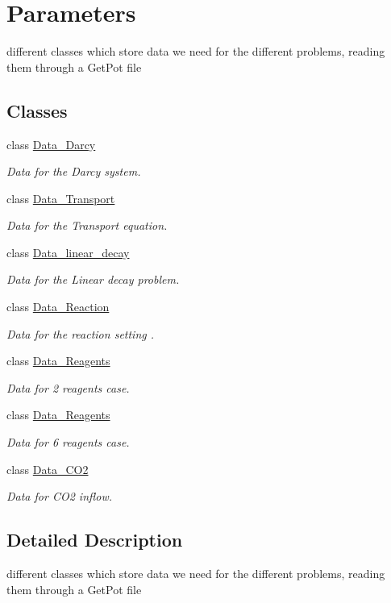 \hypertarget{group__Parameters}{}\section{Parameters}
\label{group__Parameters}


different classes which store data we need for the different problems, reading them through a Get\+Pot file  


\subsection*{Classes}
\begin{DoxyCompactItemize}
\item 
class \hyperlink{classData__Darcy}{Data\+\_\+\+Darcy}
\begin{DoxyCompactList}\small\item\em Data for the Darcy system. \end{DoxyCompactList}\item 
class \hyperlink{classData__Transport}{Data\+\_\+\+Transport}
\begin{DoxyCompactList}\small\item\em Data for the Transport equation. \end{DoxyCompactList}\item 
class \hyperlink{classData__linear__decay}{Data\+\_\+linear\+\_\+decay}
\begin{DoxyCompactList}\small\item\em Data for the Linear decay problem. \end{DoxyCompactList}\item 
class \hyperlink{classData__Reaction}{Data\+\_\+\+Reaction}
\begin{DoxyCompactList}\small\item\em Data for the reaction setting . \end{DoxyCompactList}\item 
class \hyperlink{classData__2Reagents}{Data\+\_\+Reagents}
\begin{DoxyCompactList}\small\item\em Data for 2 reagents case. \end{DoxyCompactList}\item 
class \hyperlink{classData__6Reagents}{Data\+\_\+Reagents}
\begin{DoxyCompactList}\small\item\em Data for 6 reagents case. \end{DoxyCompactList}\item 
class \hyperlink{classData__CO2}{Data\+\_\+\+C\+O2}
\begin{DoxyCompactList}\small\item\em Data for C\+O2 inflow. \end{DoxyCompactList}\end{DoxyCompactItemize}


\subsection{Detailed Description}
different classes which store data we need for the different problems, reading them through a Get\+Pot file 


